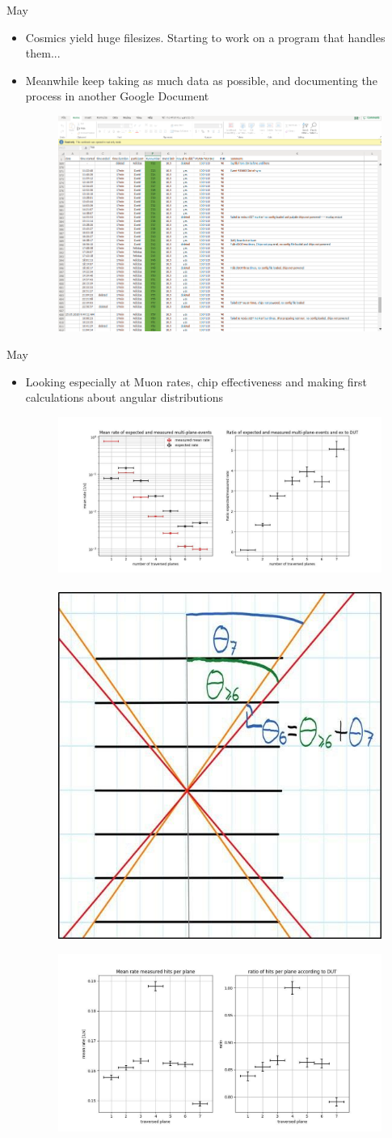 \documentclass{beamer}
\begin{document}
\begin{frame}{May}
    \begin{itemize}
	\item Cosmics yield huge filesizes. Starting to work on a program that
	    handles them...
	\item Meanwhile keep taking as much data as possible, and
	    documenting the process in another Google Document
	    \begin{figure}[H]
		\centering
		\includegraphics[width=.4\textwidth]{DavidCosmicProgress.png}
	    \end{figure}
    \end{itemize}
\end{frame}
\begin{frame}{May}
    \begin{itemize}
	\item Looking especially at Muon rates, chip effectiveness and
	    making first calculations about angular distributions
	    \begin{figure}[H]
		\centering
		\includegraphics[width=.6\textwidth]{DavidFirstRate.jpg}
		\
		\includegraphics[width=.25\textwidth]{DavidFirstAngle.jpg}
	    \end{figure}
	    \begin{figure}[H]
		\centering
		\includegraphics[width=.4\textwidth]{DavidFirstEff.jpg}
	    \end{figure}
    \end{itemize}
\end{frame}
\end{document}
